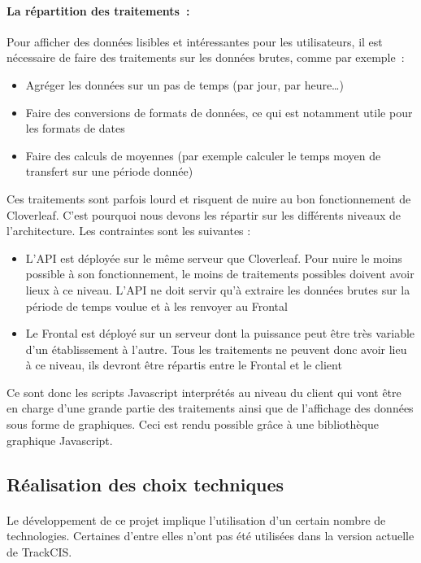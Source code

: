 			\paragraph{La répartition des traitements~:}
			Pour afficher des données lisibles et intéressantes pour les utilisateurs, il
			est nécessaire de faire des traitements sur les données brutes, comme par
			exemple~:
			\begin{itemize}
			  \item Agréger les données sur un pas de temps (par jour, par heure\ldots)
			  \item Faire des conversions de formats de données, ce qui est notamment
			  utile pour les formats de dates
			  \item Faire des calculs de moyennes (par exemple calculer le temps moyen de
			  transfert sur une période donnée)
			\end{itemize}
			Ces traitements sont parfois lourd et risquent de nuire au bon fonctionnement
			de Cloverleaf. C'est pourquoi nous devons les répartir sur les différents
			niveaux de l'architecture. Les contraintes sont les suivantes :
			\begin{itemize}
			  \item L'API est déployée sur le même serveur que Cloverleaf. Pour nuire le
			  moins possible à son fonctionnement, le moins de traitements possibles
			  doivent avoir lieux à ce niveau. L'API ne doit servir qu'à extraire les
			  données brutes sur la période de temps voulue et à les renvoyer au Frontal
			  \item Le Frontal est déployé sur un serveur dont la puissance peut être
			  très variable d'un établissement à l'autre. Tous les traitements ne
			  peuvent donc avoir lieu à ce niveau, ils devront être répartis entre le
			  Frontal et le client
			\end{itemize}
			Ce sont donc les scripts Javascript interprétés au niveau du client qui vont
			être en charge d'une grande partie des traitements ainsi que de l'affichage
			des données sous forme de graphiques. Ceci est rendu possible grâce à une
			bibliothèque graphique Javascript.
			
		\subsection{Réalisation des choix techniques}
			\paragraph{}%
			Le développement de ce projet implique l'utilisation d'un certain nombre de
			technologies. Certaines d'entre elles n'ont pas été utilisées dans la version
			actuelle de TrackCIS.
			
